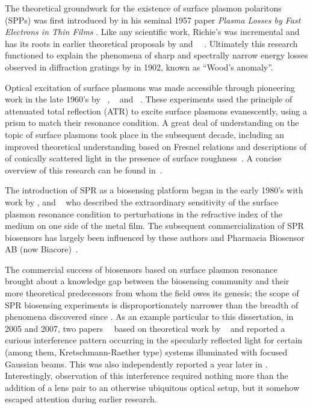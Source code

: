 The theoretical groundwork for the existence of surface plasmon polaritons
(SPPs) was first introduced by  in his seminal 1957 paper
\textit{Plasma Losses by Fast Electrons in Thin Films}
\cite{ritchie1957plasma}.  Like any scientific work, Richie's was
incremental and has its roots in earlier theoretical proposals by
 and
~\cite{bohm1951collective}~\cite{pines1952collective}.
Ultimately this research functioned to explain the phenomena of sharp and
spectrally narrow energy losses observed in diffraction gratings by
 in 1902, known as ``Wood's anomaly''.

Optical excitation of surface plasmons was made accessible through
pioneering work in the late 1960's by
~\cite{kretschmann1968},
~\cite{raether1965springer} and
~\cite{otto1968excitation}.  These experiments used the
principle of attenuated total reflection (ATR) to excite surface plasmons
evanescently, using a prism to match their resonance condition.  A great
deal of understanding on the topic of surface plasmons took place in the
subsequent decade, including an improved theoretical understanding based on
Fresnel relations \cite{chen1976excitation} and descriptions of of
conically scattered light in the presence of surface
roughness~\cite{simon1976directional}.  A concise overview of this research
can be found in~\cite{raether1997surface}.

The introduction of SPR as a biosensing platform began in the early 1980's
with work by ,  and
~\cite{liedberg1983surface} who described the
extraordinary sensitivity of the surface plasmon resonance condition to
perturbations in the refractive index of the medium on one side of the
metal film.  The subsequent commercialization of SPR biosensors has largely
been influenced by these authors and Pharmacia Biosensor AB (now
Biacore)~\cite{liedberg1995biosensing}.

The commercial success of biosensors based on surface plasmon resonance
brought about a knowledge gap between the biosensing community and their
more theoretical predecessors from whom the field owes its genesis; the
scope of SPR biosensing experiments is disproportionately narrower than the
breadth of phenomena discovered since .  As an example particular to
this dissertation, in 2005 and 2007, two
papers~\cite{andaloro2005optical}~\cite{simon2007observation} based on
theoretical work by ~\cite{chuang1986lateral} and
 \cite{chen1976excitation} reported a curious interference
pattern occurring in the specularly reflected light for certain (among
them, Kretschmann-Raether type) systems illuminated with focused Gaussian
beams.  This was also independently reported a year later in
\cite{schumann2008near}.  Interestingly, observation of this interference
required nothing more than the addition of a lens pair to an otherwise 
ubiquitous optical setup, but it somehow escaped attention during earlier
research.  

